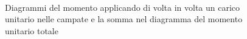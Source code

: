 \begin{figure}[p]
 \\
\caption{Diagrammi del momento applicando di volta in volta un carico unitario nelle campate e la somma nel diagramma del momento unitario totale}
\label{fig:MomentiUnitari}
\end{figure}
